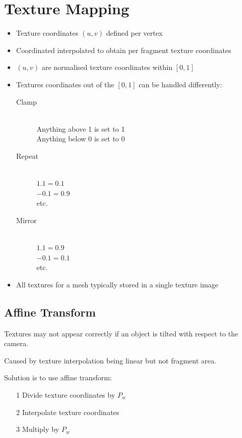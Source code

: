 \documentclass[a4paper]{article}
\begin{document}
\section{Texture Mapping}

\begin{itemize}
  \item Texture coordinates $(u, v)$ defined per vertex
  \item Coordinated interpolated to obtain per fragment texture coordinates
  \item $(u, v)$ are normalised texture coordinates within $[0, 1]$
  \item Textures coordinates out of the $[0, 1]$ can be handled differently:
    \begin{description}
      \item[Clamp] \hfill \\
        Anything above 1 is set to 1 \\
        Anything below 0 is set to 0
      \item[Repeat] \hfill \\
        $1.1 = 0.1$ \\
        $-0.1 = 0.9$ \\
        etc.
      \item[Mirror] \hfill \\
        $1.1 = 0.9$ \\
        $-0.1 = 0.1$ \\
        etc.
    \end{description}
  \item All textures for a mesh typically stored in a single texture image
\end{itemize}

\subsection{Affine Transform}

Textures may not appear correctly if an object is tilted with respect to the
camera.

Caused by texture interpolation being linear but not fragment area.

Solution is to use affine transform:

\begin{enumerate}
  \item[1] Divide texture coordinates by $P_{w}$
  \item[2] Interpolate texture coordinates
  \item[3] Multiply by $P_{w}$
\end{enumerate}
\end{document}
